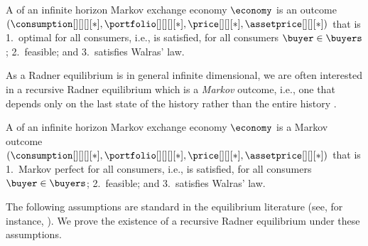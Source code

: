{\begin{definition}
    A  \cite{radner1972existence} of an infinite horizon Markov exchange economy $\economy$ is an outcome $(\consumption[][][][*], \portfolio[][][][*], \price[][][*], \assetprice[][][*])$
    that is
    1.~optimal for all consumers, i.e.,  is satisfied, for all consumers $\buyer \in \buyers$; 
    2.~feasible; and 
    3.~satisfies Walras' law.
\end{definition}

As a Radner equilibrium is in general infinite dimensional, we are often interested in a recursive Radner equilibrium which is a \emph{Markov\/} outcome, i.e., one that depends only on the last state of the history rather than the entire history .


\begin{definition}\label{def:rre}
    A  \cite{mehra1977recursive, prescott1980recursive} of an infinite horizon Markov exchange economy $\economy$ is a Markov outcome $(\consumption[][][][*], \portfolio[][][][*], \price[][][*], \assetprice[][][*])$
    that is 
    1.~Markov perfect for all consumers, i.e.,  is satisfied, for all consumers $\buyer \in \buyers$; 
    2.~feasible; and 
    3.~satisfies Walras' law.
\end{definition}



The following assumptions are standard in the equilibrium literature (see, for instance, \citet{geanakoplos1990introduction}).
We prove the existence of a recursive Radner equilibrium under these assumptions.

}
